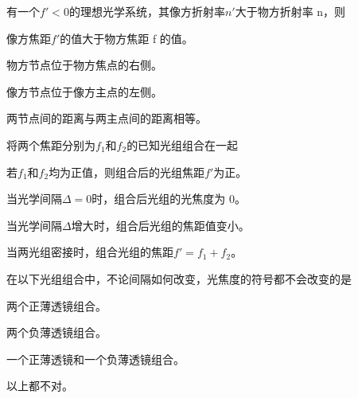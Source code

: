 \documentclass[padl, analysis, notocnum]{ExBook}
\newcommand{\answerarea}[1][3.5cm]{%
  \par\vspace{1mm}%
  \noindent{\color{themeColor!35}\rule{\linewidth}{0.4pt}}\par
  \noindent\begin{minipage}[t][#1][t]{\linewidth}\vspace{0pt}\end{minipage}\par
  \noindent{\color{themeColor!35}\rule{\linewidth}{0.4pt}}\par
}
\begin{document}
\begin{qitems}[startnum=8]
\qitem 有一个$f'<0$的理想光学系统，其像方折射率$n'$大于物方折射率 n，则
\par\noindent\hspace{2em}像方焦距$f'$的值大于物方焦距 f 的值。
\par\noindent\hspace{2em}物方节点位于物方焦点的右侧。
\par\noindent\hspace{2em}像方节点位于像方主点的左侧。
\par\noindent\hspace{2em}两节点间的距离与两主点间的距离相等。
\label{q:25:start}
\answerarea[4.0cm]
\label{q:25:end}
\end{qitems}

\begin{qitems}[startnum=9]
\qitem 将两个焦距分别为$f_{1}$和$f_{2}$的已知光组组合在一起
\par\noindent\hspace{2em}若$f_{1}$和$f_{2}$均为正值，则组合后的光组焦距$f'$为正。
\par\noindent\hspace{2em}当光学间隔$\Delta =0$时，组合后光组的光焦度为 0。
\par\noindent\hspace{2em}当光学间隔$\Delta$增大时，组合后光组的焦距值变小。
\par\noindent\hspace{2em}当两光组密接时，组合光组的焦距$f'=f_{1}+f_{2}$。
\label{q:26:start}
\answerarea[4.0cm]
\label{q:26:end}
\end{qitems}

\begin{qitems}[startnum=10]
\qitem 在以下光组组合中，不论间隔如何改变，光焦度的符号都不会改变的是
\par\noindent\hspace{2em}两个正薄透镜组合。
\par\noindent\hspace{2em}两个负薄透镜组合。
\par\noindent\hspace{2em}一个正薄透镜和一个负薄透镜组合。
\par\noindent\hspace{2em}以上都不对。
\label{q:27:start}
\answerarea[4.0cm]
\label{q:27:end}
\end{qitems}
\end{document}
